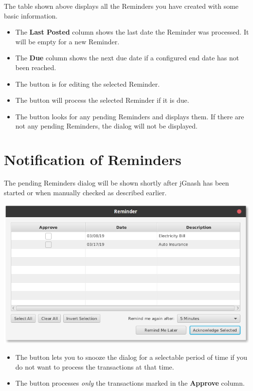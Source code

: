 \documentclass[letterpaper,12pt]{book}
\begin{document}
    The table shown above displays all the Reminders you have created with some basic information.

    \begin{itemize}
        \item The \textbf{Last Posted} column shows the last date the Reminder was processed. It will be empty for a new Reminder.
        \item The \textbf{Due} column shows the next due date if a configured end date has not been reached.
        \item The  button is for editing the selected Reminder.
        \item The  button will process the selected Reminder if it is due.
        \item The  button looks for any pending Reminders and displays them. If there are not
        any pending Reminders, the dialog will not be displayed.
    \end{itemize}

    \section{Notification of Reminders}
    The pending Reminders dialog will be shown shortly after jGnash has been started or when manually checked
    as described earlier.

    \includegraphics[width=0.8\linewidth]{images/remindersPopupDialog}

    \begin{itemize}
        \item The  button lets you to snooze the dialog for a selectable period of time if you do not want to
        process the transactions at that time.
        \item The  button processes \textit{only} the transactions marked in the \textbf{Approve} column.
    \end{itemize}
\end{document}
